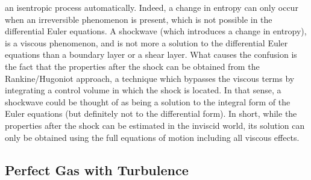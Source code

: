 \documentclass{warpdoc}
\numberwithin{equation}{section}
\begin{document}
an isentropic process automatically. Indeed, a change in entropy can only
occur when an irreversible phenomenon is present, which is not possible
in the differential Euler equations.
A shockwave (which introduces a change in entropy),
is a viscous phenomenon, and is not more a solution to the differential Euler
equations than a boundary layer or a shear layer. What causes the confusion is
the fact that the properties after the shock can be obtained from the
Rankine/Hugoniot approach, a technique which bypasses the viscous terms by
integrating a control volume in which the shock is located. In that sense, a
shockwave could be thought of as being a solution to the integral form of the
Euler equations (but definitely not to the differential form). In short, while the
properties after the shock can be estimated in the inviscid world, its solution
can only be obtained using the full equations of motion including all viscous effects.






\subsection{Perfect Gas with Turbulence}
\end{document}
